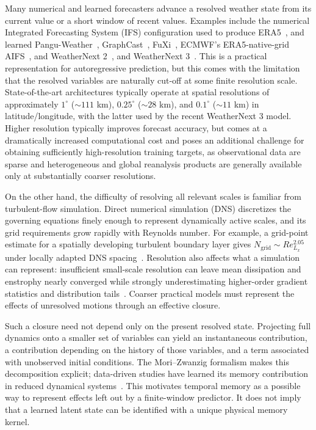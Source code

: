 \documentclass{article}
\begin{document}


Many numerical and learned forecasters advance a resolved weather state from its current value or a short window of recent values. Examples include the numerical Integrated Forecasting System (IFS) configuration used to produce ERA5~\citep{ecmwf2016ifsdynamics,hersbach2020era5}, and learned Pangu-Weather~\citep{bi2023pangu}, GraphCast~\citep{lam2023graphcast}, FuXi~\citep{chen2023fuxi}, ECMWF's ERA5-native-grid AIFS~\citep{lang2024aifs}, and WeatherNext 2~\citep{alet2025weathernext2}, and WeatherNext 3~\citep{rasp2026weathernext3}. This is a practical representation for autoregressive prediction, but this comes with the limitation that the resolved variables are naturally cut-off at some finite resolution scale. State-of-the-art architectures typically operate at spatial resolutions of approximately \(1^\circ\) (\(\sim 111\) km), \(0.25^\circ\) (\(\sim 28\) km), and \(0.1^\circ\) (\(\sim 11\) km) in latitude/longitude, with the latter used by the recent WeatherNext 3 model. Higher resolution typically improves forecast accuracy, but comes at a dramatically increased computational cost and poses an additional challenge for obtaining sufficiently high-resolution training targets, as observational data are sparse and heterogeneous and global reanalysis products are generally available only at substantially coarser resolutions.

On the other hand, the difficulty of resolving all relevant scales is familiar from turbulent-flow simulation. Direct numerical simulation (DNS) discretizes the governing equations finely enough to represent dynamically active scales, and its grid requirements grow rapidly with Reynolds number. For example, a grid-point estimate for a spatially developing turbulent boundary layer gives $N_{\mathrm{grid}}\sim Re_{L_x}^{2.05}$ under locally adapted DNS spacing~\citep{yang2021grid}. Resolution also affects what a simulation can represent: insufficient small-scale resolution can leave mean dissipation and enstrophy nearly converged while strongly underestimating higher-order gradient statistics and distribution tails~\citep{DonzisResolutionEffects}. Coarser practical models must represent the effects of unresolved motions through an effective closure.

Such a closure need not depend only on the present resolved state. Projecting full dynamics onto a smaller set of variables can yield an instantaneous contribution, a contribution depending on the history of those variables, and a term associated with unobserved initial conditions. The Mori--Zwanzig formalism makes this decomposition explicit; data-driven studies have learned its memory contribution in reduced dynamical systems~\citep{YenTingLinMZ2021,de2026data}. This motivates temporal memory as a possible way to represent effects left out by a finite-window predictor. It does not imply that a learned latent state can be identified with a unique physical memory kernel.
\end{document}
